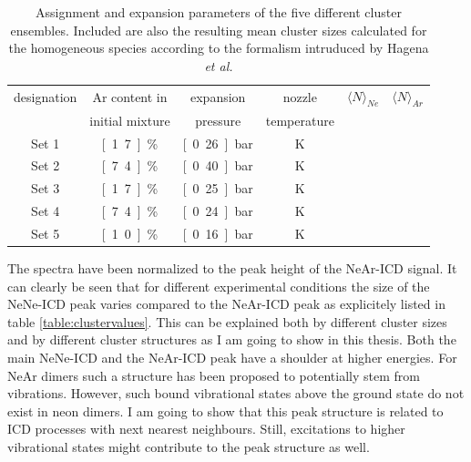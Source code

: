 \begin{table}[!h]
 \centering
 \caption{Assignment and expansion parameters of the five different
          cluster ensembles. Included are also the resulting mean
          cluster sizes calculated for the homogeneous species according
          to the formalism intruduced by Hagena \it{et al.}
          \cite{Hagena72}}
  \begin{tabular}{c c c c c c}
          \toprule
           designation    &       Ar content in   & expansion & nozzle & $\langle N\rangle _{Ne}$ & $\langle N\rangle _{Ar}$ \\
                                          &       initial mixture &  pressure & temperature & &  \\
          \midrule
          Set 1   &       \unit[1.7]{\%}  &       \unit[0.26]{bar}        &       \unit[63]{K}    &       \unit[5]        &       \unit[520]      \\
          Set 2   &       \unit[7.4]{\%}  &       \unit[0.40]{bar}        &       \unit[60]{K}    &       \unit[17]       &       \unit[1850] \\
          Set 3   &       \unit[1.7]{\%}  &       \unit[0.25]{bar}        &       \unit[57]{K}    &       \unit[7]        &       \unit[810]  \\
          Set 4   &       \unit[7.4]{\%}  &       \unit[0.24]{bar}        &       \unit[58]{K}    &       \unit[6]        &       \unit[670]  \\
          Set 5   &       \unit[1.0]{\%}  &       \unit[0.16]{bar}        &       \unit[54]{K}    &       \unit[3]        &       \unit[380]  \\
          \bottomrule
  \end{tabular}
\label{table:expansion_conditions}
\end{table}

The spectra have been normalized to the peak height of the NeAr-ICD signal.
It can clearly be seen that for different experimental conditions the
size of the NeNe-ICD peak varies compared to the NeAr-ICD peak as explicitely
listed in table \ref{table:clustervalues}. This can be
explained both by different cluster sizes and by different cluster structures
as I am going to show in this thesis. Both the main NeNe-ICD and the NeAr-ICD peak
have a shoulder at higher energies. For NeAr dimers such a structure has
been proposed to potentially stem from vibrations. However, such bound vibrational
states above the ground state do not exist in neon dimers. I am going to show
that this peak structure is related to \ac{ICD} processes with next nearest
neighbours. Still, excitations to higher vibrational states might contribute
to the peak structure as well.

